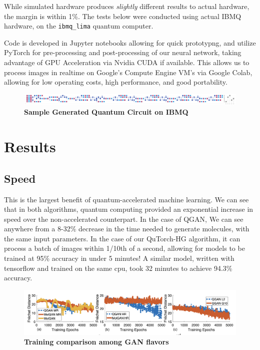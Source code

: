 \documentclass{scrartcl}
\begin{document}
While simulated hardware produces \emph{slightly} different results to actual hardware, the margin is within 1\%. The tests below were conducted using actual IBMQ hardware, on the \verb~ibmq_lima~ quantum computer.

Code is developed in Jupyter notebooks allowing for quick prototypng, and utilize PyTorch for pre-processing and post-processing of our neural network, taking advantage of GPU Acceleration via Nvidia CUDA if available. This allows us to process images in realtime on Google's Compute Engine VM's via Google Colab, allowing for low operating costs, high performance, and good portability.

\begin{figure}[htbp]
\centering
\includegraphics[width=.9\linewidth]{./assets/circuit.png}
\caption{\textbf{Sample Generated Quantum Circuit on IBMQ}}
\end{figure}

\section{Results}
\label{sec:org564a799}

\subsection{Speed}
\label{sec:org2d16445}

This is the largest benefit of quantum-accelerated machine learning.  We can see that in both algorithms, quantum computing provided an exponential increase in speed over the non-accelerated counterpart. In the case of QGAN, We can see anywhere from a 8-32\% decrease in the time needed to generate molecules, with the same input parameters. In the case of our QuTorch-HG algorithm, it can process a batch of images within 1/10th of a second, allowing for models to be trained at 95\% accuracy in under 5 minutes! A similar model, written with tensorflow and trained on the same cpu, took 32 minutes to achieve 94.3\% accuracy.

\begin{figure}[htbp]
\centering
\includegraphics[width=.9\linewidth]{./assets/quganresults.png}
\caption{\textbf{Training comparison among GAN flavors}}
\end{figure}
\end{document}
